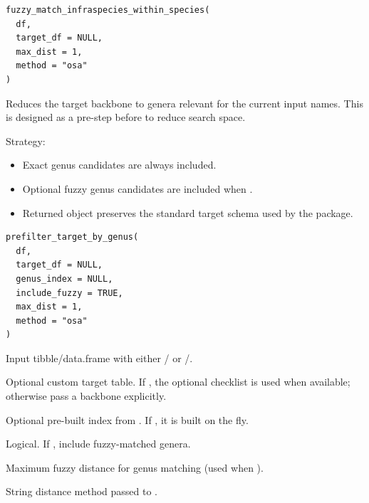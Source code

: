 \documentclass[a4paper]{book}
\begin{document}
%
\begin{Usage}
\begin{verbatim}
fuzzy_match_infraspecies_within_species(
  df,
  target_df = NULL,
  max_dist = 1,
  method = "osa"
)
\end{verbatim}
\end{Usage}
%
\begin{Description}
\strong{[Stable]}

Reduces the target backbone to genera relevant for the current input names.
This is designed as a pre-step before  to reduce search space.

Strategy:
\begin{itemize}

\item{} Exact genus candidates are always included.
\item{} Optional fuzzy genus candidates are included when .
\item{} Returned object preserves the standard target schema used by the package.

\end{itemize}

\end{Description}
%
\begin{Usage}
\begin{verbatim}
prefilter_target_by_genus(
  df,
  target_df = NULL,
  genus_index = NULL,
  include_fuzzy = TRUE,
  max_dist = 1,
  method = "osa"
)
\end{verbatim}
\end{Usage}
%
\begin{Arguments}
\begin{ldescription}
\item[\code{df}] Input tibble/data.frame with either / or /.

\item[\code{target\_df}] Optional custom target table. If , the optional  checklist is used when available; otherwise pass a backbone explicitly.

\item[\code{genus\_index}] Optional pre-built index from . If , it is built on the fly.

\item[\code{include\_fuzzy}] Logical. If , include fuzzy-matched genera.

\item[\code{max\_dist}] Maximum fuzzy distance for genus matching (used when ).

\item[\code{method}] String distance method passed to .
\end{ldescription}
\end{Arguments}
\end{document}
